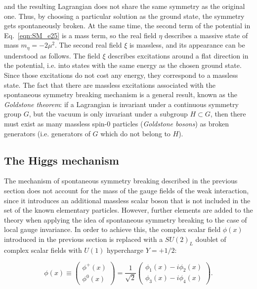 \noindent and the resulting Lagrangian does not share the same symmetry as the original one. Thus, by choosing a particular solution as the ground state, the symmetry gets spontaneously broken.
At the same time, the second term of the potential in Eq.~\ref{eqn:SM_e25} is a mass term, so the real field $\eta$ describes a massive state of mass $m_\eta = -2\mu^2$.
The second real field $\xi$ is massless, and its appearance can be understood as follows.
The field $\xi$ describes excitations around a flat direction in the potential, i.e. into states with the same energy as the chosen ground state.
Since those excitations do not cost any energy, they correspond to a massless state.
The fact that there are massless excitations associated with the spontaneous symmetry breaking mechanism is a general result, known as the \textit{Goldstone theorem}:
if a Lagrangian is invariant under a continuous symmetry group $G$, but the vacuum is only invariant under a subgroup $H \subset G$,
then there must exist as many massless spin-0 particles (\textit{Goldstone bosons}) as broken generators (i.e. generators of $G$ which do not belong to $H$).\\

\subsection{The Higgs mechanism}\label{subsec:HiggsMech}

The mechanism of spontaneous symmetry breaking described in the previous section does not account for the mass of the gauge fields of the weak interaction,
since it introduces an additional massless scalar boson that is not included in the set of the known elementary particles.
However, further elements are added to the theory  when applying the idea of spontaneous symmetry breaking to the case of local gauge invariance.
In order to achieve this, the complex scalar field $\phi(x)$ introduced in the previous section is replaced with a $SU(2)_L$ doublet of complex scalar fields with $U(1)$ hypercharge $Y = +1/2$:

\begin{equation}\label{eqn:SM_e26}
\phi(x) \equiv
\begin{pmatrix}
  \phi^+(x) \\ \phi^0(x)
\end{pmatrix}
= \frac{1}{\sqrt{2}}
\begin{pmatrix}
  \phi_1(x) - i\phi_2(x) \\ \phi_3(x) - i\phi_4(x)
\end{pmatrix}.
\end{equation}

